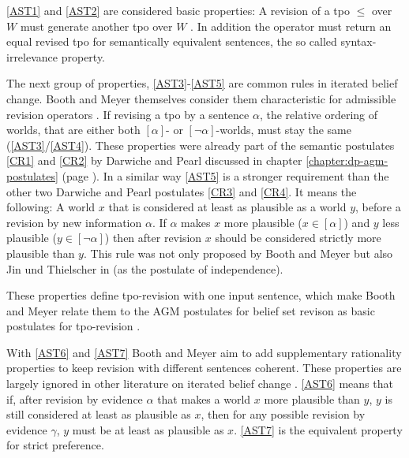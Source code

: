 \documentclass[english, 12pt]{scrartcl}
\theoremstyle{definition}
\theoremstyle{definition}
\theoremstyle{definition}
\begin{document}

\ref{AST1} and \ref{AST2} are considered basic properties: A revision of a tpo $\leq$ over $W$ must generate another tpo over $W$ . In addition the operator must return an equal revised tpo for semantically equivalent sentences, the so called syntax-irrelevance property.

The next group of properties, \ref{AST3}-\ref{AST5} are common rules in iterated belief change. Booth and Meyer themselves consider them characteristic for admissible revision operators \cite{Booth2006a}.
If revising a tpo by a sentence $\alpha$, the relative ordering of worlds, that are either both $[\alpha]$- or $[\neg\alpha]$-worlds, must stay the same (\ref{AST3}/\ref{AST4}). These properties were already part of the semantic postulates \ref{CR1} and \ref{CR2} by Darwiche and Pearl \cite{Darwiche1997} discussed in chapter \ref{chapter:dp-agm-postulates} (page \pageref{chapter:dp-agm-postulates}).
In a similar way \ref{AST5} is a stronger requirement than the other two Darwiche and Pearl postulates \ref{CR3} and \ref{CR4}. It means the following: A world $x$ that is considered at least as plausible as a world $y$, before a revision by new information $\alpha$. If $\alpha$ makes $x$ more plausible ($x \in [\alpha]$) and $y$ less plausible ($y \in [\neg\alpha]$) then after revision $x$ should be considered strictly more plausible than $y$. This rule was not only proposed by Booth and Meyer \cite{Booth2006a} but also Jin und Thielscher in \cite{Jin2007} (as the postulate of independence).


These properties define tpo-revision with one input sentence, which make Booth and Meyer relate them to the AGM postulates for belief set revison \cite{Alchourron1985} as basic postulates for tpo-revision \cite{Booth2011}.

With \ref{AST6} and \ref{AST7} Booth and Meyer aim to add supplementary rationality properties to keep revision with different sentences coherent. These properties are largely ignored in other literature on iterated belief change \cite{Booth2011}. \ref{AST6} means that if, after revision by evidence $\alpha$ that makes a world $x$ more plausible than $y$, $y$ is still considered at least as plausible as $x$, then for any possible revision by evidence $\gamma$, $y$ must be at least as plausible as $x$. \ref{AST7} is the equivalent property for strict preference.
\end{document}
